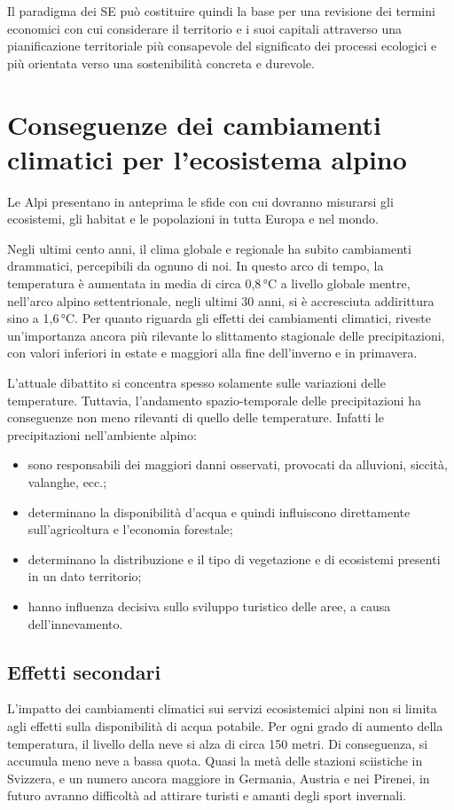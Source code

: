 \documentclass[12pt,a4paper]{article}
\begin{document}
	Il paradigma dei SE può costituire quindi la base per una revisione dei termini economici con cui considerare il territorio e i suoi capitali attraverso una  pianificazione territoriale più consapevole del significato dei processi ecologici e più orientata verso una sostenibilità concreta e durevole.
	
	
	\section{Conseguenze dei cambiamenti climatici per l'ecosistema alpino \cite{LeAlpi}}
	
	Le Alpi presentano in anteprima le sfide con cui dovranno misurarsi gli ecosistemi, gli habitat e le popolazioni in tutta Europa e nel mondo.
	
	Negli ultimi cento anni, il clima globale e regionale ha subito cambiamenti drammatici, percepibili da ognuno di noi. In questo arco di tempo, la temperatura è aumentata in media di circa 0,8\,°C a livello globale mentre, nell'arco alpino settentrionale, negli ultimi 30 anni, si è accresciuta addirittura sino a 1,6\,°C. Per quanto riguarda gli effetti dei cambiamenti climatici, riveste un'importanza ancora più rilevante lo slittamento stagionale delle precipitazioni, con valori inferiori in estate e maggiori alla fine dell'inverno e in primavera.
	
	L'attuale dibattito si concentra spesso solamente sulle variazioni delle temperature. Tuttavia, l'andamento spazio-temporale delle precipitazioni ha conseguenze non meno rilevanti di quello delle temperature. Infatti le precipitazioni nell'ambiente alpino:	
	\begin{itemize}
		\item sono responsabili dei maggiori danni osservati, provocati da alluvioni, siccità, valanghe, ecc.;
		\item determinano la disponibilità d'acqua e quindi influiscono direttamente sull'agricoltura e l'economia forestale;
		\item determinano la distribuzione e il tipo di vegetazione e di ecosistemi presenti in un dato territorio;
		\item hanno influenza decisiva sullo sviluppo turistico delle aree, a causa dell'innevamento.
	\end{itemize}
	
	
	\subsection{Effetti secondari}
		L'impatto dei cambiamenti climatici sui servizi ecosistemici alpini non si limita agli effetti sulla disponibilità di acqua potabile. Per ogni grado di aumento della temperatura, il livello della neve si alza di circa 150 metri. Di conseguenza, si accumula meno neve a bassa quota. Quasi la metà delle stazioni sciistiche in Svizzera, e un numero ancora maggiore in Germania, Austria e nei Pirenei, in futuro avranno difficoltà ad attirare turisti e amanti degli sport invernali.
		
\end{document}
